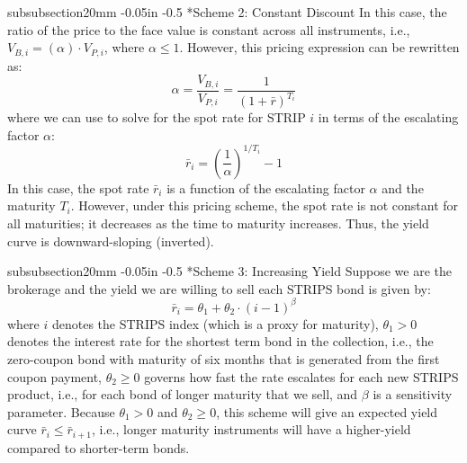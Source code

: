 \documentclass[11pt]{article}
\makeatletter
\theoremstyle{definition}
\renewcommand\subsubsection{\@startsection
	{subsubsection}{2}{0mm}
	{-0.05in}
	{-0.5\baselineskip}
	{\normalfont\normalsize\itshape\bfseries}}
\makeatother
\begin{document}
\subsubsection*{Scheme 2: Constant Discount}
In this case, the ratio of the price to the face value is constant across all instruments, i.e., $V_{B, i} = \left(\alpha\right)\cdot{V}_{P, i}$, where $\alpha\leq{1}$. However, this pricing expression can be rewritten as:
\begin{equation}
\alpha = \frac{V_{B,i}}{V_{P,i}} = \frac{1}{\left(1+\bar{r}\right)^{T_{i}}}
\end{equation}
where we can use to solve for the spot rate for STRIP $i$ in terms of the escalating factor $\alpha$:
\begin{equation}
\bar{r}_{i} = \left(\frac{1}{\alpha}\right)^{1/T_{i}} - 1
\end{equation}
In this case, the spot rate $\bar{r}_{i}$ is a function of the escalating factor $\alpha$ and the maturity $T_{i}$. 
However, under this pricing scheme, the spot rate is not constant for all maturities; it decreases as the time to maturity increases. Thus, the yield curve is downward-sloping (inverted).

\subsubsection*{Scheme 3: Increasing Yield}
Suppose we are the brokerage and the yield we are willing to sell each STRIPS bond is given by:
\begin{equation}
\bar{r}_{i} = \theta_{1}+\theta_{2}\cdot\left(i-1\right)^{\beta}
\end{equation}
where $i$ denotes the STRIPS index (which is a proxy for maturity), 
$\theta_{1}>0$ denotes the interest rate for the shortest term bond in the collection, i.e., the zero-coupon bond with maturity of six months that is generated from the first coupon payment, $\theta_{2}\geq{0}$ governs how fast the rate escalates for each new STRIPS product, i.e., for each bond of longer maturity that we sell, and $\beta$ is a sensitivity parameter. Because $\theta_{1}>{0}$ and $\theta_{2}\geq{0}$, this scheme will give an expected yield curve $\bar{r}_{i}\leq\bar{r}_{i+1}$, i.e., longer maturity instruments will have a higher-yield compared to shorter-term bonds.
\end{document}
